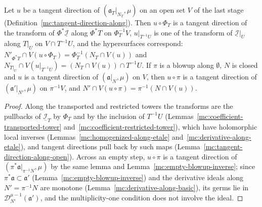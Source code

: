 \begin{lemma}
\label{mc:tangent-direction-canonical-along}
\leanok
Let \(u\) be a tangent direction of \((\mathfrak a_T|_{N_T},\mu)\) on an open set \(V\) of the last stage (Definition~\ref{mc:tangent-direction-along}). Then \(u\circ\Phi_T\) is a
tangent direction of the transform of \(\Phi^*\underline{\mathcal I}\) along \(\Phi^*T\) on \(\Phi_T^{-1}V\), \(u|_{T^{-1}U}\) is one of the transform of \(\underline{\mathcal I}|_U\)
along \(T|_U\) on \(V\cap T^{-1}U\), and the hypersurfaces correspond: \(N'_{\Phi^*T}\cap V(u\circ\Phi_T)=\Phi_T^{-1}(N_T\cap V(u))\) and
\(N_{T|_U}\cap V(u|_{T^{-1}U})=(N_T\cap V(u))\cap T^{-1}U\). If \(\pi\) is a blowup along \(\emptyset\), \(N\) is closed and \(u\) is a tangent direction of
\((\mathfrak a|_N,\mu)\) on \(V\), then \(u\circ\pi\) is a tangent direction of \((\mathfrak a'|_{N'},\mu)\) on \(\pi^{-1}V\), and \(N'\cap V(u\circ\pi)=\pi^{-1}(N\cap V(u))\).
\end{lemma}
\begin{proof}
\leanok
Along the transported and restricted towers the transforms are the pullbacks of \(\underline{\mathcal I}_T\) by \(\Phi_T\) and by the inclusion of \(T^{-1}U\)
(Lemmas~\ref{mc:coefficient-transported-tower} and~\ref{mc:coefficient-restricted-tower}), which have holomorphic local inverses
(Lemmas~\ref{mc:homogenized-along-etale} and~\ref{mc:derivative-along-etale}), and tangent directions pull back by such maps (Lemma~\ref{mc:tangent-direction-along-open}).
Across an empty step, \(u\circ\pi\) is a tangent direction of \((\pi^*\mathfrak a|_{\pi^{-1}N},\mu)\) by the same lemma and Lemma~\ref{mc:empty-blowup-inverse}; since
\(\pi^*\mathfrak a\subset\mathfrak a'\) (Lemma~\ref{mc:empty-blowup-inverse}) and the derivative ideals along \(N'=\pi^{-1}N\) are monotone
(Lemma~\ref{mc:derivative-along-basic}), its germs lie in \(\mathcal D^{\mu-1}_{N'}(\mathfrak a')\), and the multiplicity-one condition does not involve the ideal.
\end{proof}
